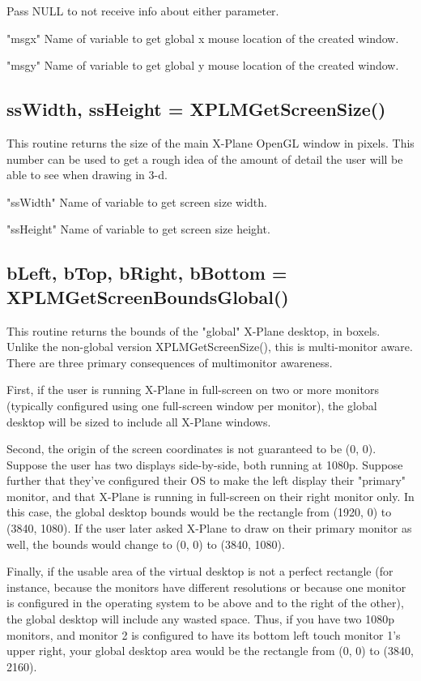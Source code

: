 \documentclass[11pt,parskip=half,a4paper]{scrartcl}
\begin{document}
Pass NULL to not receive info about either parameter.

"msgx" Name of variable to get global x mouse location of the created window.

"msgy" Name of variable to get global y mouse location of the created window.

\subsection{\hspace*{1.0mm}ssWidth, ssHeight = XPLMGetScreenSize()}

This routine returns the size of the main X-Plane OpenGL window in pixels. This number can be used to get a rough idea of the amount of detail the user will be able to see when drawing in 3-d.

"ssWidth" Name of variable to get screen size width.

"ssHeight" Name of variable to get screen size height.

\newpage

\subsection{\hspace*{1.0mm}bLeft, bTop, bRight, bBottom = XPLMGetScreenBoundsGlobal()}

This routine returns the bounds of the "global" X-Plane desktop, in boxels. Unlike the non-global version XPLMGetScreenSize(), this is multi-monitor aware. There are three primary consequences of multimonitor awareness.

First, if the user is running X-Plane in full-screen on two or more monitors (typically configured using one full-screen window per monitor), the global desktop will be sized to include all X-Plane windows.

Second, the origin of the screen coordinates is not guaranteed to be (0, 0). Suppose the user has two displays side-by-side, both running at 1080p. Suppose further that they've configured their OS to make the left display their "primary" monitor, and that X-Plane is running in full-screen on their right monitor only. In this case, the global desktop bounds would be the rectangle from (1920, 0) to (3840, 1080). If the user later asked X-Plane to draw on their primary monitor as well, the bounds would change to (0, 0) to (3840, 1080).

Finally, if the usable area of the virtual desktop is not a perfect rectangle (for instance, because the monitors have different resolutions or because one monitor is configured in the operating system to be above and to the right of the other), the global desktop will include any wasted space. Thus, if you have two 1080p monitors, and monitor 2 is configured to have its bottom left touch monitor 1's upper right, your global desktop area would be the rectangle from (0, 0) to (3840, 2160).
\end{document}
